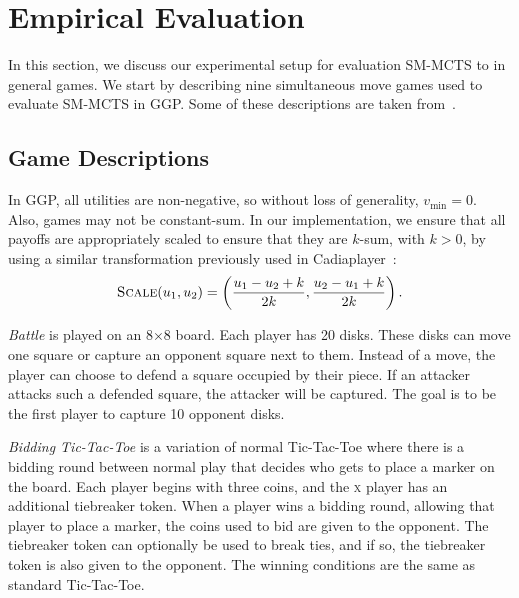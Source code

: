 \documentclass[conference]{IEEEtran}
\begin{document}
\section{Empirical Evaluation}
\label{sec:exp}

In this section, we discuss our experimental setup for evaluation SM-MCTS to in general games.
We start by describing nine simultaneous move games used to evaluate SM-MCTS in GGP. Some of these 
descriptions are taken from~\cite[Appendix C]{Finnsson12}.


\subsection{Game Descriptions}
\label{subsec:games}
In GGP, all utilities are non-negative, so without loss of generality, $v_{\min} = 0$. 
Also, games may not be constant-sum. In our implementation, we ensure that all payoffs 
are appropriately scaled to ensure that they are $k$-sum, with $k > 0$, by using 
a similar transformation previously used in Cadiaplayer~\cite{Finnsson12}:
\[ \text{\sc Scale}(u_1, u_2) = \left( \frac{u_1 - u_2 + k}{2k}, \frac{u_2 - u_1 + k}{2k} \right). \]

\textit{Battle} is played on an 8$\times$8 board. Each player has 20 disks. These disks can move one square or 
capture an opponent square next to them. Instead of a move, the player can choose to defend a square occupied by their 
piece. If an attacker attacks such a defended square, the attacker will be captured. The goal is to be the first player 
to capture 10 opponent disks. 

\textit{Bidding Tic-Tac-Toe} is a variation of normal Tic-Tac-Toe where there is a bidding round between 
normal play that decides who gets to place a marker on the board. Each player begins with three coins, and the 
\textsc{x} player has an additional tiebreaker token. When a player wins a bidding round, allowing that player to 
place a marker, the coins used to bid are given to the opponent. The tiebreaker token can optionally be used to break 
ties, and if so, the tiebreaker token is also given to the opponent. The winning conditions are the same as 
standard Tic-Tac-Toe. 
\end{document}
